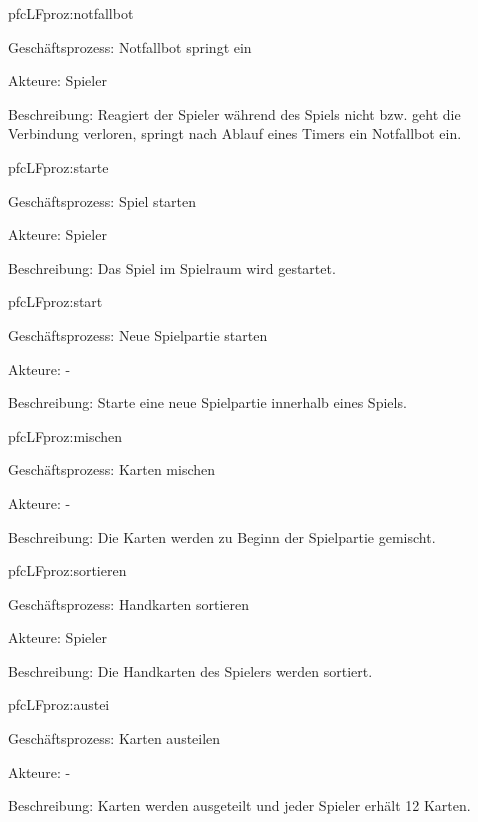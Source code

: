 \begin{description}[leftmargin=5em, style=sameline]
	\begin{lhp}{pfc}{LF}{proz:notfallbot}
		\item [Geschäftsprozess:] Notfallbot springt ein
		\item [Akteure:] Spieler
		\item [Beschreibung:] Reagiert der Spieler während des Spiels nicht bzw. geht die Verbindung verloren, springt nach Ablauf eines Timers ein Notfallbot ein.
	\end{lhp}
	
	\begin{lhp}{pfc}{LF}{proz:starte}
		\item [Geschäftsprozess:] Spiel starten
		\item [Akteure:] Spieler
		\item [Beschreibung:] Das Spiel im Spielraum wird gestartet.
	\end{lhp}

	\begin{lhp}{pfc}{LF}{proz:start}
		\item [Geschäftsprozess:] Neue Spielpartie starten
		\item [Akteure:] - 
		\item [Beschreibung:] Starte eine neue Spielpartie innerhalb eines Spiels.
	\end{lhp}

	\begin{lhp}{pfc}{LF}{proz:mischen}
		\item [Geschäftsprozess:] Karten mischen
		\item [Akteure:] -
		\item [Beschreibung:] Die Karten werden zu Beginn der Spielpartie gemischt.
	\end{lhp}
	
	\begin{lhp}{pfc}{LF}{proz:sortieren}
		\item [Geschäftsprozess:] Handkarten sortieren
		\item [Akteure:] Spieler
		\item [Beschreibung:] Die Handkarten des Spielers werden sortiert.
	\end{lhp}

	\begin{lhp}{pfc}{LF}{proz:austei}
		\item [Geschäftsprozess:] Karten austeilen
		\item [Akteure:] -
		\item [Beschreibung:] Karten werden ausgeteilt und jeder Spieler erhält 12 Karten.
	\end{lhp}


\end{description}
